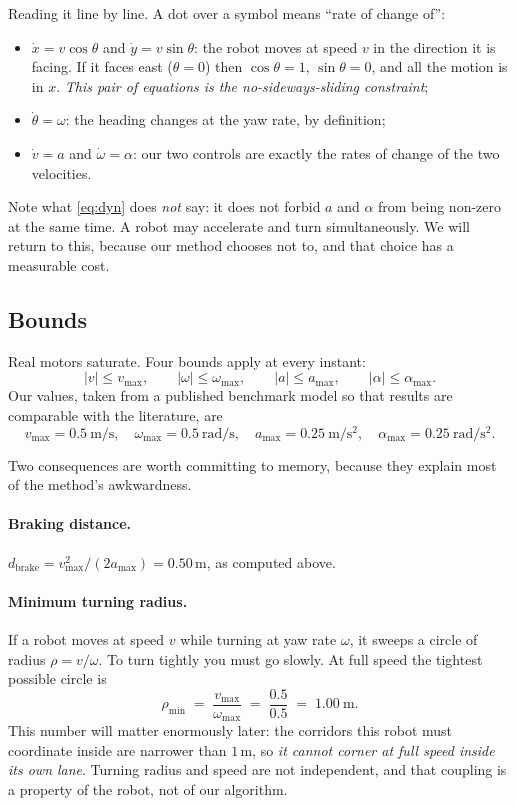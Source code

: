 \documentclass[11pt,a4paper]{article}
\begin{document}
Reading it line by line. A dot over a symbol means ``rate of change of'':
\begin{itemize}[nosep]
\item $\dot{x} = v\cos\theta$ and $\dot{y} = v\sin\theta$: the robot moves at speed $v$ in
      the direction it is facing. If it faces east ($\theta = 0$) then $\cos\theta = 1$,
      $\sin\theta = 0$, and all the motion is in $x$. \emph{This pair of equations is the
      no-sideways-sliding constraint};
\item $\dot{\theta} = \omega$: the heading changes at the yaw rate, by definition;
\item $\dot{v} = a$ and $\dot{\omega} = \alpha$: our two controls are exactly the rates of
      change of the two velocities.
\end{itemize}

Note what \eqref{eq:dyn} does \emph{not} say: it does not forbid $a$ and $\alpha$ from being
non-zero at the same time. A robot may accelerate and turn simultaneously. We will return
to this, because our method chooses not to, and that choice has a measurable cost.

\subsection{Bounds}

Real motors saturate. Four bounds apply at every instant:
\[
|v| \le v_{\max}, \qquad |\omega| \le \omega_{\max}, \qquad
|a| \le a_{\max}, \qquad |\alpha| \le \alpha_{\max}.
\]
Our values, taken from a published benchmark model so that results are comparable with the
literature, are
\[
v_{\max} = 0.5\ \mathrm{m/s},\quad
\omega_{\max} = 0.5\ \mathrm{rad/s},\quad
a_{\max} = 0.25\ \mathrm{m/s^2},\quad
\alpha_{\max} = 0.25\ \mathrm{rad/s^2}.
\]

Two consequences are worth committing to memory, because they explain most of the method's
awkwardness.

\paragraph{Braking distance.} $d_{\mathrm{brake}} = v_{\max}^2/(2a_{\max}) = 0.50$\,m, as
computed above.

\paragraph{Minimum turning radius.} If a robot moves at speed $v$ while turning at yaw rate
$\omega$, it sweeps a circle of radius $\rho = v/\omega$. To turn tightly you must go
slowly. At full speed the tightest possible circle is
\[
\rho_{\min} \;=\; \frac{v_{\max}}{\omega_{\max}} \;=\; \frac{0.5}{0.5} \;=\; 1.00\ \text{m}.
\]
This number will matter enormously later: the corridors this robot must coordinate inside
are narrower than $1$\,m, so \emph{it cannot corner at full speed inside its own lane}.
Turning radius and speed are not independent, and that coupling is a property of the robot,
not of our algorithm.
\end{document}

